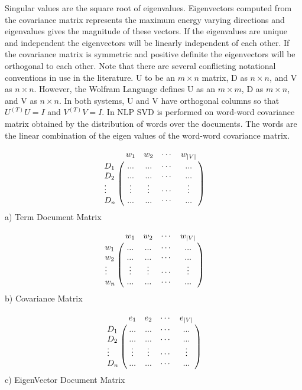 \documentclass{bmcart}
\begin{document}
Singular values are the square root of eigenvalues. Eigenvectors computed from the covariance matrix represents the maximum energy varying directions and eigenvalues gives the magnitude of these vectors. If the eigenvalues are unique and independent the eigenvectors will be linearly independent of each other. If the covariance matrix is symmetric and positive definite the eigenvectors will be orthogonal to each other. Note that there are several conflicting notational conventions in use in the literature. U to be an $m \times n$ matrix, D as $n \times n$, and V as $n \times n$. However, the Wolfram Language defines U as an $m \times m$, D as $ m \times n$, and V as $ n \times n$. In both systems, U and V have orthogonal columns so that  $U^(T)U=I$ and $V^(T)V=I$. In NLP SVD is performed on word-word covariance matrix obtained by the distribution of words over the documents. The words are the linear combination of the eigen values of the word-word covariance matrix. 

\hspace{-5mm}
\begin{minipage}{0.35\textwidth}
\centering
\begin{equation*}
\bordermatrix{~ & w_1 & w_2 & \cdots & w_{|V|} \cr
                  D_1 & ... & ... & \cdots & ... \cr
                  D_2 & ... & ... & \cdots & ... \cr
                  \vdots & \vdots &  \vdots & \cdots & \vdots \cr
                  D_n & ... & ... & \cdots & ...} 
\end{equation*}
\small{a) Term Document Matrix}
\end{minipage}%
\begin{minipage}{0.35\textwidth}
\centering
\begin{equation*}
\bordermatrix{~ & w_1 & w_2 & \cdots & w_{|V|} \cr
                  w_1 & ... & ... & \cdots & ... \cr
                  w_2 & ... & ... & \cdots & ... \cr
                  \vdots & \vdots &  \vdots & \cdots & \vdots \cr
                  w_n & ... & ... & \cdots & ...} 
\end{equation*}
\small{b) Covariance Matrix}
\end{minipage}%
\begin{minipage}{0.35\textwidth}
\begin{equation*}
                  \bordermatrix{~ & e_1 & e_2 & \cdots & e_{|V|} \cr
                  D_1 & ... & ... & \cdots & ... \cr
                  D_2 & ... & ... & \cdots & ... \cr
                  \vdots & \vdots &  \vdots & \cdots & \vdots \cr
                  D_n & ... & ... & \cdots & ...} 
\end{equation*}
\small{c) EigenVector Document Matrix}
\end{minipage}
\end{document}
